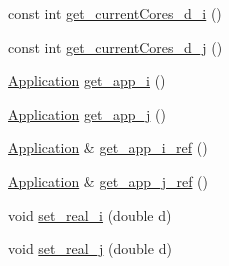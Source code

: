 \begin{DoxyCompactItemize}
const int \hyperlink{classCandidate__pair_a98ed7825fa11908514e7cfcc99013e4a}{get\-\_\-current\-Cores\-\_\-d\-\_\-i} ()
\item 
const int \hyperlink{classCandidate__pair_a6e597198ca612c1d3c610edb38b395a0}{get\-\_\-current\-Cores\-\_\-d\-\_\-j} ()
\item 
\hyperlink{classApplication}{Application} \hyperlink{classCandidate__pair_a48fd777a95c35ebb45c9d7a241cfa962}{get\-\_\-app\-\_\-i} ()
\item 
\hyperlink{classApplication}{Application} \hyperlink{classCandidate__pair_a68d1dec30fcbfd265355a980c0d01d63}{get\-\_\-app\-\_\-j} ()
\item 
\hyperlink{classApplication}{Application} \& \hyperlink{classCandidate__pair_a4d108cca57baeb0c7df2f4a527ac8692}{get\-\_\-app\-\_\-i\-\_\-ref} ()
\item 
\hyperlink{classApplication}{Application} \& \hyperlink{classCandidate__pair_ae322ed41aa4660ba68d272a4c1d7f9f9}{get\-\_\-app\-\_\-j\-\_\-ref} ()
\item 
void \hyperlink{classCandidate__pair_aee6e0ca68882feefe44c6f095961a8d7}{set\-\_\-real\-\_\-i} (double d)
\item 
void \hyperlink{classCandidate__pair_a9277d72b649e1cdd857fcb42d6926da1}{set\-\_\-real\-\_\-j} (double d)
\end{DoxyCompactItemize}

